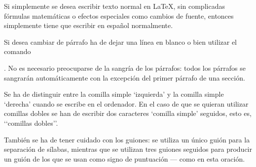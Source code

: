 \documentclass[a4paper,10pt]{letter}
\begin{document}
  Si simplemente se desea escribir texto normal en LaTeX,
  sin complicadas f\'ormulas matem\'aticas o efectos especiales
  como cambios de fuente, entonces simplemente tiene que escribir
  en espa\~nol normalmente.
  
  Si desea cambiar de p\'arrafo ha de dejar una l\'inea en blanco o bien
  utilizar el comando \par.
  No es necesario preocuparse de la sangr\'ia de los p\'arrafos:
  todos los p\'arrafos se sangrar\'an autom\'aticamente con la excepci\'on
  del primer p\'arrafo de una secci\'on.
  
  Se ha de distinguir entre la comilla simple ‘izquierda’
  y la comilla simple ‘derecha’ cuando se escribe en el ordenador.
  En el caso de que se quieran utilizar comillas dobles se han de
  escribir dos caracteres ‘comilla simple’ seguidos, esto es,
  ‘‘comillas dobles’’.
  
  Tambi\'en se ha de tener cuidado con los guiones: se utiliza un \'unico
  gui\'on para la separaci\'on de s\'ilabas, mientras que se utilizan
  tres guiones seguidos para producir un gui\'on de los que se usan
  como signo de puntuaci\'on --- como en esta oraci\'on.
  
\end{document}
